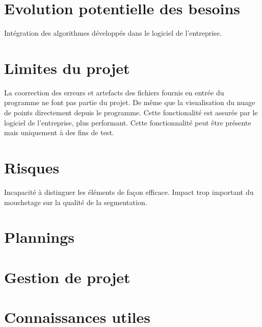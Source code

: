 \documentclass[12pt,titlepage]{report}
\begin{document}
\section{Evolution potentielle des besoins}

Intégration des algorithmes développés dans le logiciel de l'entreprise.

\section{Limites du projet}

La coorrection des erreurs et artefacts des fichiers fournis en entrée du programme ne font pas partie du projet.
De même que la visualisation du nuage de points directement depuis le programme. Cette fonctionalité est assurée par le logiciel de l'entreprise, plus performant. Cette fonctionnalité peut être présente mais uniquement à des fins de test.
\section{Risques}

Incapacité à distinguer les éléments de façon efficace.
Impact trop important du mouchetage sur la qualité de la segmentation.

\section{Plannings}


\section{Gestion de projet}


\section{Connaissances utiles}
\begin{justify}

\end{justify}
\end{document}
